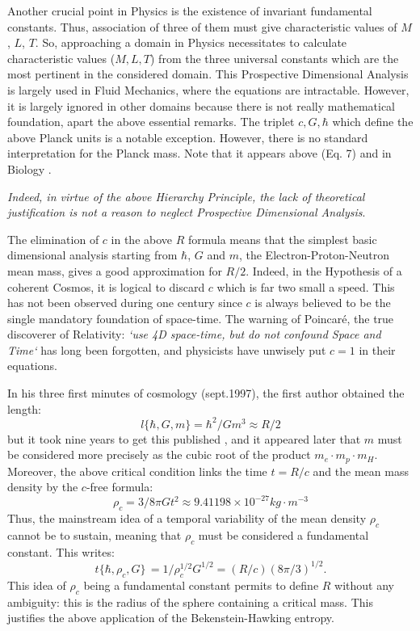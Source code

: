 \documentclass[twoside,draft]{article}
\begin{document}
\begin{sloppypar}
Another crucial point in Physics is the existence of invariant fundamental constants. Thus, association of three of them must give characteristic values of $M$, $L$, $T$. So, approaching a domain in Physics necessitates to calculate characteristic values ($M, L, T$) from the three universal constants which are the most pertinent in the considered domain. This Prospective Dimensional Analysis is largely used in Fluid Mechanics, where the equations are intractable. However, it is largely ignored in other domains because there is not really mathematical foundation, apart the above essential remarks. The triplet $c, G, \hbar$ which define the above Planck units is a notable exception. However, there is no standard interpretation for the Planck mass. Note that  it appears above (Eq. 7) and in Biology \cite{Sanchez1}. 

\textit{Indeed, in virtue of the above Hierarchy Principle, the lack of theoretical justification is not a reason to neglect Prospective Dimensional Analysis}. 

The elimination of $c$ in the above $R$ formula means that the simplest basic dimensional
analysis starting from $\hbar$, $G$ and $m$, the Electron-Proton-Neutron mean mass, gives a good
approximation for $R/2$. Indeed, in the Hypothesis of a coherent Cosmos, it is logical to discard $c$
which is far two small a speed. This has not been observed during one century since $c$ is always
believed to be the single mandatory foundation of space-time. The warning of Poincar\'{e}, the true
discoverer of Relativity: \textit{`use 4D space-time, but do not confound Space and Time`} has long been
forgotten, and physicists have unwisely put $c = 1$ in their equations.

In his three first minutes of cosmology (sept.1997), the first author obtained the length:
\begin{equation}
l \{\hbar,G,m\} = \hbar^{2} /Gm^{3} \approx R/2
\end{equation}
but it took nine years to get this published \cite{Sanchez3}, and it appeared later \cite{Sanchez1} that $m$ must be considered more precisely as the cubic root of the product 
$ m_{e} \cdot m_{p} \cdot m_{H}$. Moreover, the above critical condition
links the time $t = R/c$ and the mean mass density by the $c$-free formula:
\begin{equation}
\rho_{c} = 3/8\pi Gt^{2} \approx 9.41198 \times 10^{-27} kg \cdot m^{-3}
\end{equation}
Thus, the mainstream idea of a temporal variability of the mean density $\rho_{c}$ cannot be to
sustain, meaning that $\rho_{c}$ must be considered a fundamental constant. This writes:
\begin{equation}
t\{\hbar,\rho_{c} ,G\}\, = 1/\rho_{c}^{1/2} G^{1/2} = (R/c) (8\pi/3)^{1/2}.
\end{equation}
This idea of $\rho_{c}$ being a fundamental constant permits to define $R$ without any ambiguity: this is the 
radius of the sphere containing a critical mass. This justifies the above application of the Bekenstein-Hawking entropy. 


\end{sloppypar}
\end{document}
